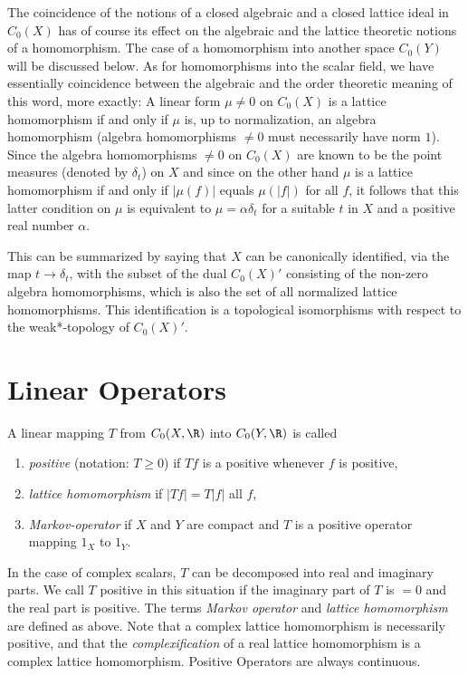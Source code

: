 The coincidence of the notions of a closed algebraic and a closed lattice ideal in $C_{0}(X)$ has of course its effect on the algebraic and the lattice theoretic notions of a homomorphism.
The case of a homomorphism into another space $C_{0}(Y)$ will be discussed below.
As for homomorphisms into the scalar field, we have essentially coincidence between the algebraic and the order theoretic meaning of this word, more exactly: A linear form $\mu \neq 0$ on $C_{0}(X)$ is a lattice homomorphism if and only if $\mu$ is, up to normalization, an algebra homomorphism (algebra homomorphisms $\neq 0$ must necessarily have norm $1$).
Since the algebra homomorphisms $\neq 0$ on $C_{0}(X)$ are known to be the point measures (denoted by $\delta_{t}$) on $X$ and since on the other hand $\mu$ is a lattice homomorphism if and only if $|\mu(f)|$ equals $\mu(|f|)$ for all $f$, it follows that this latter condition on $\mu$ is equivalent to $\mu = \alpha\delta_{t}$ for a suitable $t$ in $X$ and a positive real number $\alpha$.

This can be summarized by saying that $X$ can be canonically identified, via the map $t \to \delta_{t}$, with the subset of the dual $C_{0}(X)'$ consisting of the non-zero algebra homomorphisms, which is also the set of all normalized lattice homomorphisms.
This identification is a topological isomorphisms with respect to the weak*-topology of $ C_{0}(X)' $.
\section{Linear Operators}\label{sec:b1-1.3}
A linear mapping $T$ from $C_{0}(X,\R)$ into $C_{0}(Y,\R)$ is called
\begin{enumerate}[label=]

\item
\emph{positive} (notation: $T \geq 0$)  if $Tf$  is a positive whenever $ f $ is positive, 

\item
\emph{lattice homomorphism}  if $|Tf| = T|f|$  all $ f $,

\item
\emph{Markov-operator}  if  $ X $ and $ Y $ are compact and $ T $ is a positive operator 
mapping $1_{X}$ to $1_{Y}$.

\end{enumerate}
In the case of complex scalars, $T$ can be decomposed into real and imaginary parts.
We call $T$ positive in this situation if the imaginary part of $T$ is $= 0$ and the real part is positive.
The terms \emph{Markov operator} and \emph{lattice homomorphism} are defined as above.
Note that a complex lattice homomorphism is necessarily positive, and that the \emph{complexification} of a real lattice homomorphism is a complex lattice homomorphism.
Positive Operators are always continuous.


